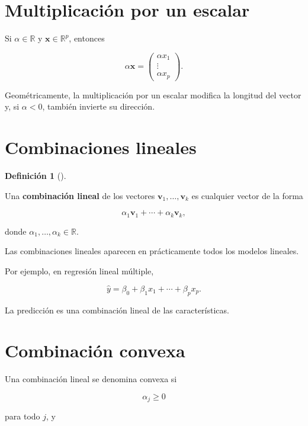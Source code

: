 \documentclass[
  spanish,
  11pt,
  letterpaper,
  DIV=11,
  numbers=noendperiod]{scrreprt}
\theoremstyle{definition}
\newtheorem{definition}{Definición}[chapter]
\theoremstyle{plain}
\theoremstyle{definition}
\theoremstyle{remark}
\begin{document}
\section{Multiplicación por un
escalar}\label{multiplicaciuxf3n-por-un-escalar}

Si \(\alpha\in\mathbb{R}\) y \(\mathbf{x}\in\mathbb{R}^{p}\), entonces

\[
\alpha\mathbf{x}
=
\begin{pmatrix}
\alpha x_1\\
\vdots\\
\alpha x_p
\end{pmatrix}.
\]

Geométricamente, la multiplicación por un escalar modifica la longitud
del vector y, si \(\alpha<0\), también invierte su dirección.

\section{Combinaciones lineales}\label{combinaciones-lineales}

\begin{definition}[]\protect\hypertarget{def-combinacion-lineal}{}\label{def-combinacion-lineal}

Una \textbf{combinación lineal} de los vectores
\(\mathbf{v}_1,\ldots,\mathbf{v}_k\) es cualquier vector de la forma

\[
\alpha_1\mathbf{v}_1+\cdots+\alpha_k\mathbf{v}_k,
\]

donde \(\alpha_1,\ldots,\alpha_k\in\mathbb{R}\).

\end{definition}

Las combinaciones lineales aparecen en prácticamente todos los modelos
lineales.

Por ejemplo, en regresión lineal múltiple,

\[
\widehat{y}
=
\beta_0
+
\beta_1x_1
+
\cdots
+
\beta_px_p.
\]

La predicción es una combinación lineal de las características.

\section{Combinación convexa}\label{combinaciuxf3n-convexa}

Una combinación lineal se denomina convexa si

\[
\alpha_j\geq 0
\]

para todo \(j\), y
\end{document}
